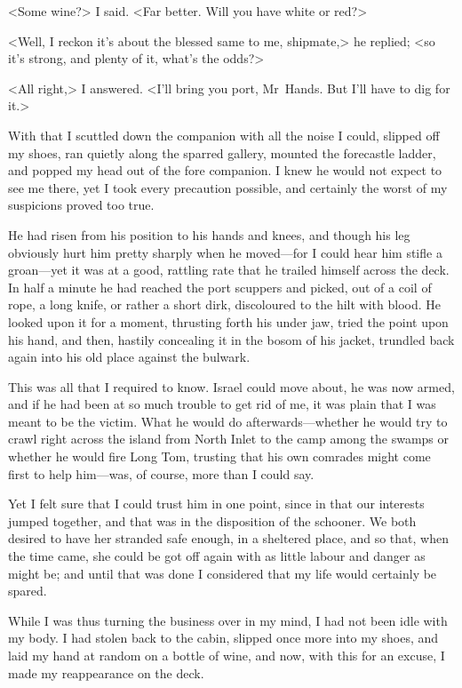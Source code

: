 <Some wine?> I said. <Far better. Will you have white or red?>

<Well, I reckon it's about the blessed same to me, shipmate,> he replied; <so it's strong, and plenty of it, what's the odds?>

<All right,> I answered. <I'll bring you port, Mr~Hands. But I'll have to dig for it.>

With that I scuttled down the companion with all the noise I could, slipped off my shoes, ran quietly along the sparred gallery, mounted the forecastle ladder, and popped my head out of the fore companion. I knew he would not expect to see me there, yet I took every precaution possible, and certainly the worst of my suspicions proved too true.

He had risen from his position to his hands and knees, and though his leg obviously hurt him pretty sharply when he moved—for I could hear him stifle a groan—yet it was at a good, rattling rate that he trailed himself across the deck. In half a minute he had reached the port scuppers and picked, out of a coil of rope, a long knife, or rather a short dirk, discoloured to the hilt with blood. He looked upon it for a moment, thrusting forth his under jaw, tried the point upon his hand, and then, hastily concealing it in the bosom of his jacket, trundled back again into his old place against the bulwark.

This was all that I required to know. Israel could move about, he was now armed, and if he had been at so much trouble to get rid of me, it was plain that I was meant to be the victim. What he would do afterwards—whether he would try to crawl right across the island from North Inlet to the camp among the swamps or whether he would fire Long Tom, trusting that his own comrades might come first to help him—was, of course, more than I could say.

Yet I felt sure that I could trust him in one point, since in that our interests jumped together, and that was in the disposition of the schooner. We both desired to have her stranded safe enough, in a sheltered place, and so that, when the time came, she could be got off again with as little labour and danger as might be; and until that was done I considered that my life would certainly be spared.

While I was thus turning the business over in my mind, I had not been idle with my body. I had stolen back to the cabin, slipped once more into my shoes, and laid my hand at random on a bottle of wine, and now, with this for an excuse, I made my reappearance on the deck.

